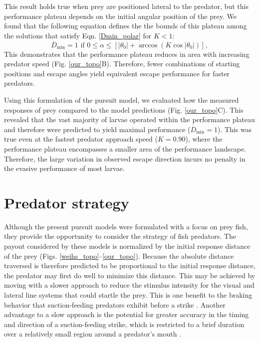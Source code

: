 \documentclass[12pt]{article}
\newcommand{\ol}{\overline}
\begin{document}
This result holds true when prey are positioned lateral to the predator, but this performance plateau depends on the initial angular position of the prey. We found that the following equation defines the  the bounds of this plateau among the solutions that satisfy Eqn. \ref{Dmin_polar} for $K<1$:
%
\begin{equation}
\ol D_{\text{min}}=1 \text{ if }  0 \leq \alpha  \leq  [|\theta_0 |  + \arccos(K \cos | \theta_0 |)],
 \end{equation}
%
This demonstrates that the performance plateau reduces in area with increasing predator speed (Fig. \ref{our_topo}B). Therefore, fewer combinations of starting positions and escape angles yield equivalent escape performance for faster predators.

Using this formulation of the pursuit model, we evaluated how the measured responses of prey compared to the model predictions (Fig. \ref{our_topo}C). This revealed that the vast majority of larvae operated within the performance plateau and therefore were predicted to yield maximal performance ($\ol D_{\text{min}}=1$). 
This was true even at the fastest predator approach speed ($K=0.90$), where the performance plateau encompasses a smaller area of the performance landscape. Therefore, the large variation in observed escape direction incurs no penalty in the evasive performance of most larvae. 


\section{Predator strategy}

Although the present pursuit models were formulated with a focus on prey fish, they provide the opportunity to consider the strategy of fish predators. The payout considered by these models is normalized by the initial response distance of the prey (Figs. \ref{weihs_topo}--\ref{our_topo}). Because the absolute distance traversed is therefore predicted to be proportional to the initial response distance, the predator may first do well to minimize this distance. 
This may be achieved by moving with a slower approach to reduce the stimulus intensity for the visual \citep{Dill:1974ws} and lateral line \citep{Stewart:2014cm} systems that could startle the prey. This is one benefit to the braking behavior that suction-feeding predators exhibit before a strike \citep{Higham:2007go, Higham:2005iu}. 
Another advantage to a slow approach is the potential for greater accuracy in the timing and direction of a suction-feeding strike, which is restricted to a brief duration over a relatively small region around a predator's mouth \citep{Wainwright:2001ufa}. 
\end{document}
